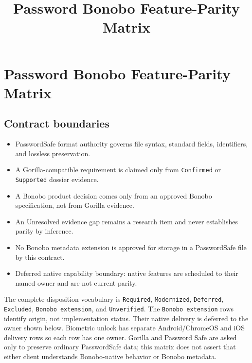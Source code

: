 \documentclass[
  letterpaper,
]{article}
\title{Password Bonobo Feature-Parity Matrix}
\author{}
\date{}
\newcommand{\passthrough}[1]{#1}
\providecommand{\tightlist}{%
  \setlength{\itemsep}{0pt}\setlength{\parskip}{0pt}}
\begin{document}
\maketitle

{
\setcounter{tocdepth}{3}
\tableofcontents
}
\section{Password Bonobo Feature-Parity Matrix}\label{password-bonobo-feature-parity-matrix}

\subsection{Contract boundaries}\label{contract-boundaries}

\begin{itemize}
\tightlist
\item
  PasswordSafe format authority governs file syntax, standard fields, identifiers, and lossless preservation.
\item
  A Gorilla-compatible requirement is claimed only from \passthrough{\lstinline!Confirmed!} or
  \passthrough{\lstinline!Supported!} dossier evidence.
\item
  A Bonobo product decision comes only from an approved Bonobo specification, not from Gorilla evidence.
\item
  An Unresolved evidence gap remains a research item and never establishes parity by inference.
\item
  No Bonobo metadata extension is approved for storage in a PasswordSafe file by this contract.
\item
  Deferred native capability boundary: native features are scheduled to their named owner and are not current parity.
\end{itemize}

The complete disposition vocabulary is \passthrough{\lstinline!Required!}, \nolinkurl{Modernized},
\passthrough{\lstinline!Deferred!}, \passthrough{\lstinline!Excluded!}, \passthrough{\lstinline!Bonobo extension!}, and
\nolinkurl{Unverified}. The \passthrough{\lstinline!Bonobo extension!} rows identify origin, not implementation status.
Their native delivery is deferred to the owner shown below. Biometric unlock has separate Android/ChromeOS and iOS
delivery rows so each row has one owner. Gorilla and Password Safe are asked only to preserve ordinary PasswordSafe
data; this matrix does not assert that either client understands Bonobo-native behavior or Bonobo metadata.
\end{document}
